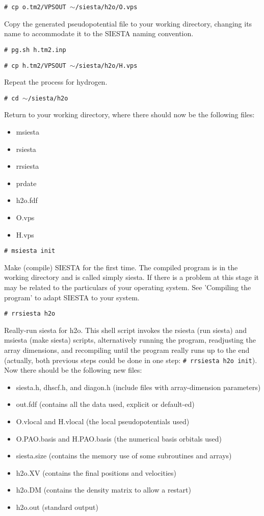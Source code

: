 {\tt \# cp o.tm2/VPSOUT $\sim$/siesta/h2o/O.vps}

Copy the generated pseudopotential file to your working directory, 
changing its name to accommodate it to the SIESTA naming convention.

{\tt \# pg.sh h.tm2.inp}

{\tt \# cp h.tm2/VPSOUT $\sim$/siesta/h2o/H.vps}

Repeat the process for hydrogen.

{\tt \# cd $\sim$/siesta/h2o}

Return to your working directory, where there should now be
the following files:
\begin{itemize}
\item msiesta
\item rsiesta
\item rrsiesta
\item prdate
\item h2o.fdf
\item O.vps
\item H.vps
\end{itemize}

{\tt \# msiesta init}

Make (compile) SIESTA for the first time. 
The compiled program
is in the working directory and is called simply siesta.
If there is a problem at this
stage it may be related to the particulars of your operating system.
See 'Compiling the program' to adapt SIESTA to your system.

{\tt \# rrsiesta h2o}

Really-run siesta for h2o. This shell script invokes the
rsiesta (run siesta) and msiesta (make siesta) scripts, 
alternatively running the program, readjusting the array dimensions,
and recompiling until the program really runs up to the end
(actually, both previous steps could be done in one
step: {\tt \# rrsiesta h2o init}).
Now there should be the following new files:
\begin{itemize}
\item siesta.h, dhscf.h, and diagon.h
 (include files with array-dimension parameters)
\item out.fdf
 (contains all the data used, explicit or default-ed) 
\item O.vlocal and H.vlocal
 (the local pseudopotentials used)
\item O.PAO.basis and H.PAO.basis
 (the numerical basis orbitals used)
\item siesta.size
 (contains the memory use of some subroutines and arrays)
\item h2o.XV
 (contains the final positions and velocities)
\item h2o.DM
 (contains the density matrix to allow a restart)
\item h2o.out
 (standard output)
\end{itemize}

